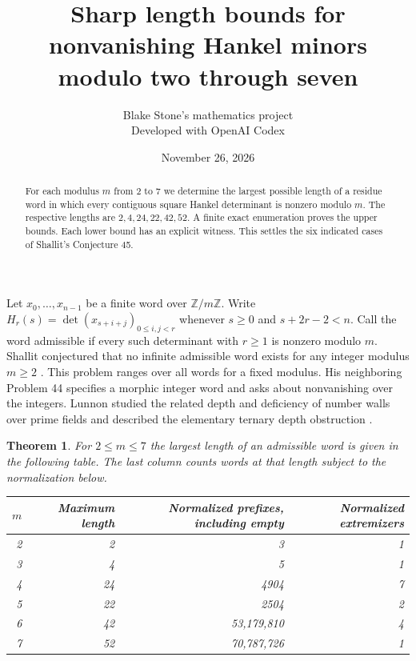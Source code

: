 \documentclass[11pt]{article}
\title{Sharp length bounds for nonvanishing Hankel minors modulo two through seven}
\author{Blake Stone's mathematics project\\\small Developed with OpenAI Codex}
\date{November 26, 2026}
\newtheorem{theorem}{Theorem}
\begin{document}
\maketitle
\begin{abstract}
For each modulus $m$ from $2$ to $7$ we determine the largest possible length of a residue word in which every contiguous square Hankel determinant is nonzero modulo $m$. The respective lengths are $2,4,24,22,42,52$. A finite exact enumeration proves the upper bounds. Each lower bound has an explicit witness. This settles the six indicated cases of Shallit's Conjecture 45.
\end{abstract}
Let $x_0,\ldots,x_{n-1}$ be a finite word over $\mathbb{Z}/m\mathbb{Z}$. Write
$H_r(s)=\det(x_{s+i+j})_{0\le i,j<r}$ whenever $s\ge0$ and $s+2r-2<n$. Call the word admissible if every such determinant with $r\ge1$ is nonzero modulo $m$. Shallit conjectured that no infinite admissible word exists for any integer modulus $m\ge2$ \cite[Conjecture 45]{shallit}. This problem ranges over all words for a fixed modulus. His neighboring Problem 44 specifies a morphic integer word and asks about nonvanishing over the integers. Lunnon studied the related depth and deficiency of number walls over prime fields and described the elementary ternary depth obstruction \cite[pp.~140--142]{pagoda}.

\begin{theorem}
For $2\le m\le7$ the largest length of an admissible word is given in the following table. The last column counts words at that length subject to the normalization below.
\begin{center}
\begin{tabular}{rrrr}\toprule
$m$&Maximum length&Normalized prefixes, including empty&Normalized extremizers\\\midrule
2&2&3&1\\3&4&5&1\\4&24&4904&7\\5&22&2504&2\\
6&42&53,179,810&4\\7&52&70,787,726&1\\\bottomrule
\end{tabular}
\end{center}
\end{theorem}
\end{document}

